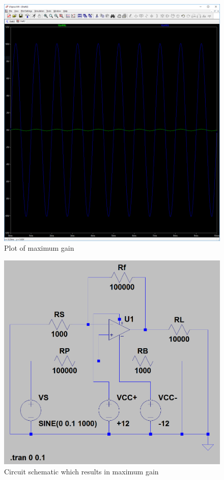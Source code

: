 \documentclass[10pt]{article}
\begin{document}
\begin{figure}[H]
	\centering
	\includegraphics[width=\textwidth]{PreLab3a2.PNG}
	\caption{Plot of maximum gain}
\end{figure}
\begin{figure}[H]
	\centering
	\includegraphics[width=\textwidth]{100000.PNG}
	\caption{Circuit schematic which results in maximum gain}
\end{figure}
\end{document}
